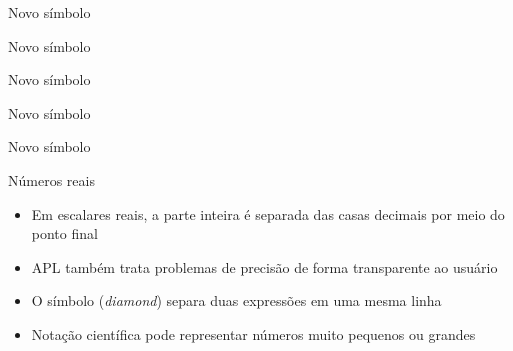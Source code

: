 \begin{frame}[fragile]{Novo símbolo}


\end{frame}

\begin{frame}[fragile]{Novo símbolo}


\end{frame}

\begin{frame}[fragile]{Novo símbolo}


\end{frame}

\begin{frame}[fragile]{Novo símbolo}


\end{frame}

\begin{frame}[fragile]{Novo símbolo}


\end{frame}

\begin{frame}[fragile]{Números reais}

    \begin{itemize}
        \item Em escalares reais, a parte inteira é separada das casas decimais por meio do ponto final
        \pause

        \item APL também trata problemas de precisão de forma transparente ao usuário
        \pause

        \item O símbolo  (\textit{diamond}) separa duas expressões em uma mesma linha
        \pause

        \item Notação científica pode representar números muito pequenos ou grandes

   \end{itemize}

\end{frame}


